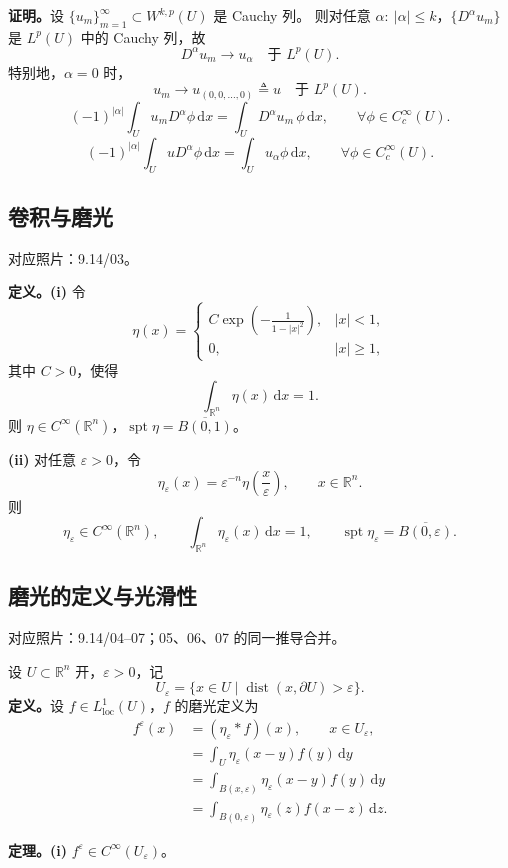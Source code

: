 \documentclass[UTF8,a4paper,11pt,fontset=fandol]{ctexart}
\newcommand{\R}{\mathbb R}
\newcommand{\dd}{\,\mathrm d}
\newcommand{\source}[1]{{\small\color{notegray}对应照片：#1。}\par}
\begin{document}
\textbf{证明。}设 $\{u_m\}_{m=1}^{\infty}\subset W^{k,p}(U)$ 是 Cauchy 列。
则对任意 $\alpha:\ |\alpha|\leq k$，$\{D^\alpha u_m\}$ 是 $L^p(U)$ 中的 Cauchy 列，故
\[
D^\alpha u_m\longrightarrow u_\alpha\quad\text{于 }L^p(U).
\]
特别地，$\alpha=0$ 时，
\[
u_m\longrightarrow u_{(0,0,\ldots,0)}\triangleq u\quad\text{于 }L^p(U).
\]
\[
(-1)^{|\alpha|}\int_Uu_mD^\alpha\phi\dd x
=\int_UD^\alpha u_m\,\phi\dd x,
\qquad\forall\phi\in C_c^\infty(U).
\]
\[
(-1)^{|\alpha|}\int_UuD^\alpha\phi\dd x
=\int_Uu_\alpha\phi\dd x,
\qquad\forall\phi\in C_c^\infty(U).
\]

\subsection*{卷积与磨光}
\source{9.14/03}
\textbf{定义。(i)} 令
\[
\eta(x)=\begin{cases}
\displaystyle C\exp\left(-\frac1{1-|x|^2}\right),&|x|<1,\\[5pt]
0,&|x|\geq1,
\end{cases}
\]
其中 $C>0$，使得
\[
\int_{\R^n}\eta(x)\dd x=1.
\]
则 $\eta\in C^\infty(\R^n)$，$\operatorname{spt}\eta=\overline{B(0,1)}$。

\textbf{(ii)} 对任意 $\varepsilon>0$，令
\[
\eta_\varepsilon(x)=\varepsilon^{-n}\eta\left(\frac{x}{\varepsilon}\right),
\qquad x\in\R^n.
\]
则
\[
\eta_\varepsilon\in C^\infty(\R^n),\qquad
\int_{\R^n}\eta_\varepsilon(x)\dd x=1,\qquad
\operatorname{spt}\eta_\varepsilon=\overline{B(0,\varepsilon)}.
\]

\newpage
\subsection*{磨光的定义与光滑性}
\source{9.14/04--07；05、06、07 的同一推导合并}
设 $U\subset\R^n$ 开，$\varepsilon>0$，记
\[
U_\varepsilon=\{x\in U\mid\operatorname{dist}(x,\partial U)>\varepsilon\}.
\]
\textbf{定义。}设 $f\in L^1_{\mathrm{loc}}(U)$，$f$ 的磨光定义为
\[
\begin{aligned}
f^\varepsilon(x)&=(\eta_\varepsilon*f)(x),\qquad x\in U_\varepsilon,\\
&=\int_U\eta_\varepsilon(x-y)f(y)\dd y\\
&=\int_{B(x,\varepsilon)}\eta_\varepsilon(x-y)f(y)\dd y\\
&=\int_{B(0,\varepsilon)}\eta_\varepsilon(z)f(x-z)\dd z.
\end{aligned}
\]
\begin{center}
\end{center}
\textbf{定理。(i)} $f^\varepsilon\in C^\infty(U_\varepsilon)$。
\end{document}
